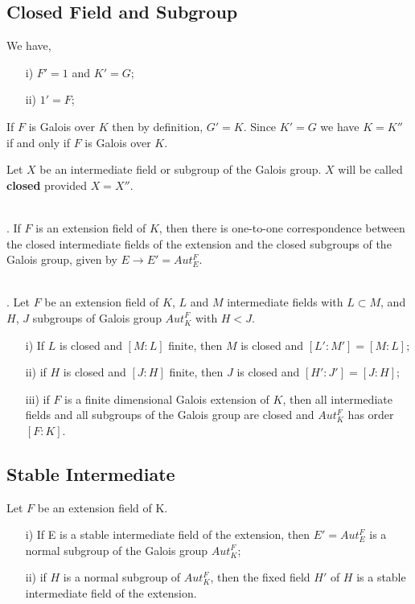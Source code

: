   \subsection{Closed Field and Subgroup}
  We have,
  \begin{enumerate}
  \item[i)] \(F'=1\) and \(K'=G\);
  \item[ii)] \(1'=F\);
    \end{enumerate}

    If \(F\) is Galois over \(K\) then by definition, \(G'=K\). Since \(K'=G\) we have \(K=K''\) if and only if \(F\) is Galois over \(K\).\\

\begin{definition}
  Let \(X\) be an intermediate field or subgroup of the Galois group. \(X\) will be called \textbf{closed} provided \(X=X''\).\\ \\
\end{definition}

\begin{lemma}. If \(F\) is an extension field of \(K\), then there is one-to-one correspondence between the closed intermediate fields of the extension and the closed subgroups of the Galois group, given by \(E \rightarrow E' =  Aut_E^F\).\\ \\
\end{lemma}

\begin{lemma}. Let \(F\) be an extension field of \(K\), \(L\) and \(M\) intermediate fields with \(L \subset M\), and \(H\), \(J\) subgroups of Galois group \(Aut_K^F\) with \(H<J\).
    \begin{enumerate}
    \item[i)] If \(L\) is closed and \([M:L]\) finite, then \(M\) is closed and \([L':M']=[M:L]\);
    \item[ii)] if \(H\) is closed and \([J:H]\) finite, then \(J\) is closed and \([H':J']=[J:H]\);
      \item[iii)] if \(F\) is a finite dimensional Galois extension of \(K\), then all intermediate fields and all subgroups of the Galois group are closed and \(Aut_K^F\) has order \([F:K]\).
\end{enumerate}
\end{lemma}


\subsection{Stable Intermediate}
\begin{lemma}
Let \(F\) be an extension field of K.
      \begin{enumerate}
      \item[i)] If E is a stable intermediate field of the extension, then \(E'=Aut_E^F\) is a normal subgroup of the Galois group \(Aut_K^F\);
        \item[ii)] if \(H\) is a normal subgroup of \(Aut_K^F\), then the fixed field \(H'\) of \(H\) is a stable intermediate field of the extension.
        \end{enumerate}
        \end{lemma}

